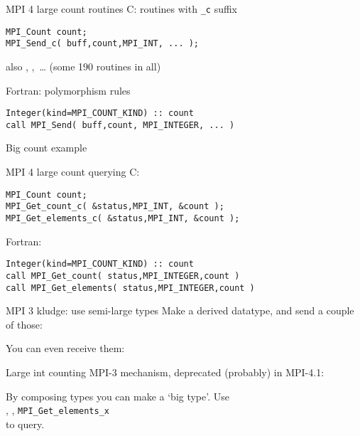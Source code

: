 \begin{numberedframe}{MPI 4 large count routines}
C: routines with \lstinline+_c+ suffix
\begin{lstlisting}
MPI_Count count;
MPI_Send_c( buff,count,MPI_INT, ... );
\end{lstlisting}
\lstset{language=Fortran}
also , ,~\ldots
(some 190 routines in all)

Fortran: polymorphism rules
\begin{lstlisting}
Integer(kind=MPI_COUNT_KIND) :: count
call MPI_Send( buff,count, MPI_INTEGER, ... )
\end{lstlisting}
\lstset{language=C}
\end{numberedframe}

\begin{numberedframe}{Big count example}
\end{numberedframe}


\begin{numberedframe}{MPI 4 large count querying}
C: 
\begin{lstlisting}
MPI_Count count;
MPI_Get_count_c( &status,MPI_INT, &count );
MPI_Get_elements_c( &status,MPI_INT, &count );
\end{lstlisting}
\lstset{language=Fortran}
Fortran: 
\begin{lstlisting}
Integer(kind=MPI_COUNT_KIND) :: count
call MPI_Get_count( status,MPI_INTEGER,count )
call MPI_Get_elements( status,MPI_INTEGER,count )
\end{lstlisting}
\lstset{language=C}
\end{numberedframe}

\begin{numberedframe}{MPI 3 kludge: use semi-large types}
  Make a derived datatype, and send a couple of those:
  

  You can even receive them:

\end{numberedframe}

\begin{numberedframe}{Large int counting}
  MPI-3 mechanism, deprecated (probably) in MPI-4.1: 

  By composing types you can make a `big type'. Use\\
  ,
  ,
   \lstinline{MPI_Get_elements_x}\\
  to query.

\end{numberedframe}

